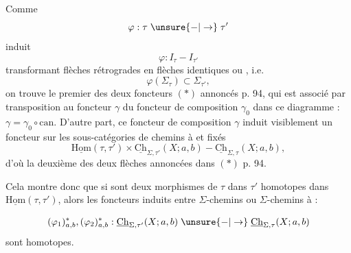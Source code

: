 Comme 
\[
\varphi:\tau\mathrel{\unsure{-|\to}}\tau'
\]
induit
\[
\varphi:I_\tau\mathrel{-}I_{\tau'}
\]
transformant flèches rétrogrades en flèches identiques ou , i.e.
\[
\varphi(\Sigma_\tau)\subset\Sigma_{\tau'},
\]
on trouve le premier des deux foncteurs $(*)$ annoncés p. 94, qui est associé par transposition au foncteur $\gamma$
 du foncteur de composition $\gamma_0$ dans ce diagramme : $\gamma=\gamma_0\circ\mathrm{can}$. D'autre part, ce foncteur de composition $\gamma$ induit visiblement un foncteur sur les sous-catégories de chemins à   et   fixés
\[
\underline{\mathrm{Hom}}(\tau,\tau')\times\underline{\mathrm{Ch}}_{\Sigma,\tau'}(X;a,b)\mathrel{-}\underline{\mathrm{Ch}}_{\Sigma,\tau}(X;a,b),
\]
d'où la deuxième des deux flèches annoncées dans $(*)$ p. 94.

Cela montre donc que si
sont deux morphismes de $\tau$ dans $\tau'$ homotopes dans $\underline{\mathrm{Hom}}(\tau,\tau')$, alors les  foncteurs induits entre   $\Sigma$-chemins ou  $\Sigma$-chemins à   :


\[
(\varphi_1)_{a,b}^*,(\varphi_2)_{a,b}^*:\underline{\mathrm{Ch}}_{\Sigma,\tau'}(X;a,b)\mathrel{\unsure{-|\to}}\underline{\mathrm{Ch}}_{\Sigma,\tau}(X;a,b)
\]
sont  homotopes. 

